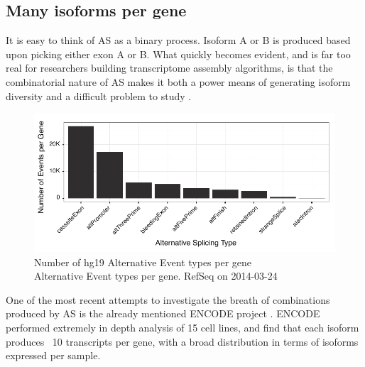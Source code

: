 

\subsection{Many isoforms per gene}\label{sec:IsoformsPerGene}

It is easy to think of AS as a binary process. Isoform A or B is produced based upon picking either exon A or B. What quickly becomes evident, and is far too real for researchers building transcriptome assembly algorithms, is that the combinatorial nature of AS makes it both a power means of generating isoform diversity and a difficult problem to study \citep{Trapnell2012a}.
 
\begin{figure}[htbp]
	\centering 
	\includegraphics{Figures/ASEventTypesPlot.pdf}
	\caption[Number of hg19 Alternative Event types per gene]
	{
		Number of hg19 Alternative Event types per gene\\[0.25cm]
		Alternative Event types per gene. RefSeq on 2014-03-24
	}
	\label{fig:asEventsBarChart}
\end{figure}

One of the most recent attempts to investigate the breath of combinations produced by AS is the already mentioned ENCODE project \citep{Djebali2012}. ENCODE performed extremely in depth analysis of 15 cell lines, and find that each isoform produces ~10 transcripts per gene, with a broad distribution in terms of isoforms expressed per sample. 

